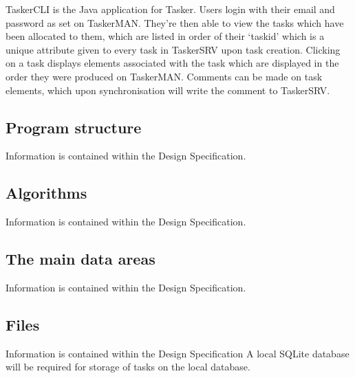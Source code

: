 \documentclass{project}
\begin{document}
TaskerCLI is the Java application for Tasker. Users login with their email and password as set on TaskerMAN. They're then able to view the tasks which have been allocated to them, which are listed in order of their `taskid' which is a unique attribute given to every task in TaskerSRV upon task creation. Clicking on a task displays elements associated with the task which are displayed in the order they were produced on TaskerMAN. Comments can be made on task elements, which upon synchronisation will write the comment to TaskerSRV.
\subsection{Program structure}
Information is contained within the Design Specification\cite{se.qa.ds}.

\subsection{Algorithms}
Information is contained within the Design Specification\cite{se.qa.ds}.

\subsection{The main data areas}
Information is contained within the Design Specification\cite{se.qa.ds}.

\subsection{Files}
Information is contained within the Design Specification\cite{se.qa.ds} A local SQLite database will be required for storage of tasks on the local database.
\end{document}

